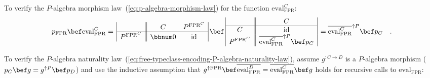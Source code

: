 To verify the $P$-algebra morphism law~(\ref{eq:p-algebra-morphism-law})
for the function $\text{eval}_{\text{FPR}}^{C}$:
\[
p_{\text{FPR}}\bef\text{eval}_{\text{FPR}}^{C}=\,\begin{array}{|c||cc|}
 & C & P^{\text{FPR}^{C}}\\
\hline P^{\text{FPR}^{C}} & \bbnum 0 & \text{id}
\end{array}\,\bef\,\begin{array}{|c||c|}
 & C\\
\hline C & \text{id}\\
P^{\text{FPR}^{C}} & \overline{\text{eval}_{\text{FPR}}^{C}}^{\uparrow P}\bef p_{C}
\end{array}\,=\overline{\text{eval}_{\text{FPR}}^{C}}^{\uparrow P}\bef p_{C}\quad.
\]

To verify the $P$-algebra naturality law~(\ref{eq:free-typeclass-encoding-P-algebra-naturality-law}),
assume $g^{:C\rightarrow D}$ is a $P$-algebra morphism ($p_{C}\bef g=g^{\uparrow P}\bef p_{D}$)
and use the inductive assumption that $g^{\uparrow\text{FPR}}\bef\overline{\text{eval}_{\text{FPR}}^{D}}=\overline{\text{eval}_{\text{FPR}}^{C}}\bef g$
holds for recursive calls to $\text{eval}_{\text{FPR}}$:
